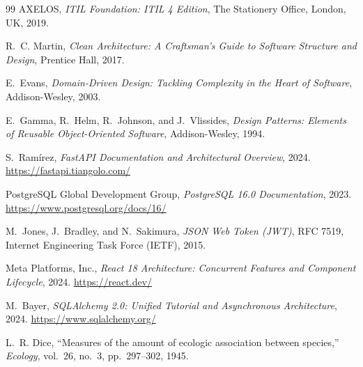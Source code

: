 \documentclass[11pt,a4paper,oneside]{report}
\begin{document}
\cleardoublepage
{}
{}
\begin{thebibliography}{99}
AXELOS, \textit{ITIL Foundation: ITIL 4 Edition}, The Stationery Office, London, UK, 2019.

R.~C. Martin, \textit{Clean Architecture: A Craftsman's Guide to Software Structure and Design}, Prentice Hall, 2017.

E.~Evans, \textit{Domain-Driven Design: Tackling Complexity in the Heart of Software}, Addison-Wesley, 2003.

E.~Gamma, R.~Helm, R.~Johnson, and J.~Vlissides, \textit{Design Patterns: Elements of Reusable Object-Oriented Software}, Addison-Wesley, 1994.

S.~Ramírez, \textit{FastAPI Documentation and Architectural Overview}, 2024. \url{https://fastapi.tiangolo.com/}

PostgreSQL Global Development Group, \textit{PostgreSQL 16.0 Documentation}, 2023. \url{https://www.postgresql.org/docs/16/}

M.~Jones, J.~Bradley, and N.~Sakimura, \textit{JSON Web Token (JWT)}, RFC 7519, Internet Engineering Task Force (IETF), 2015.

Meta Platforms, Inc., \textit{React 18 Architecture: Concurrent Features and Component Lifecycle}, 2024. \url{https://react.dev/}

M.~Bayer, \textit{SQLAlchemy 2.0: Unified Tutorial and Asynchronous Architecture}, 2024. \url{https://www.sqlalchemy.org/}

L.~R. Dice, ``Measures of the amount of ecologic association between species,'' \textit{Ecology}, vol.~26, no.~3, pp.~297--302, 1945.
\end{thebibliography}
\end{document}
